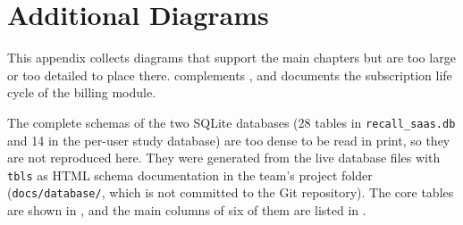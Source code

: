 \chapter{Additional Diagrams}\label{app:diagrams}

This appendix collects diagrams that support the main chapters but are too large or too detailed to
place there.  complements , and  documents the
subscription life cycle of the billing module.

The complete schemas of the two SQLite databases (28 tables in \texttt{recall\_saas.db} and 14 in the
per-user study database) are too dense to be read in print, so they are not reproduced here. They were
generated from the live database files with \texttt{tbls} as HTML schema documentation in the team's
project folder (\texttt{docs/database/}, which is not committed to the Git repository). The core tables
are shown in , and the main columns of six of them are listed in .



